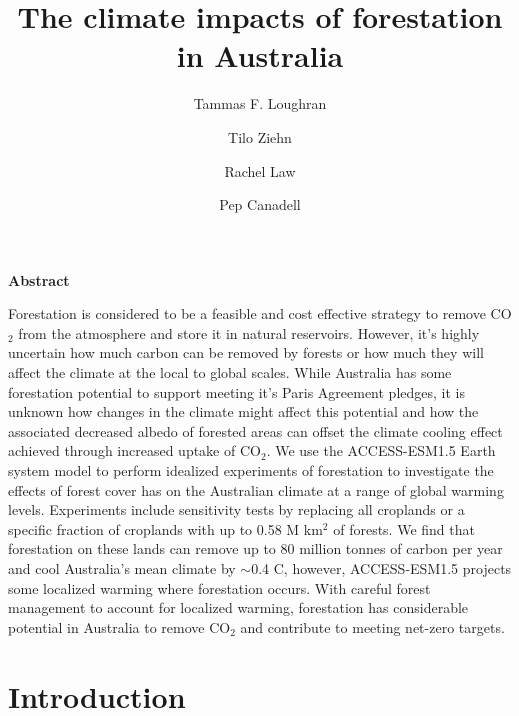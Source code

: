 \documentclass[]{article}
\title{The climate impacts of forestation in Australia}
\author[1]{Tammas F. Loughran}
\author[1]{Tilo Ziehn}
\author[1]{Rachel Law}
\author[1]{Pep Canadell}
\affil[1]{CSIRO, Environment, Australia}
\begin{document}
\maketitle

\begin{center}
    \Large
    \vspace{0.9cm}
    \textbf{Abstract}
\end{center}

Forestation is considered to be a feasible and cost effective strategy to remove CO$_2$ from the atmosphere and store it in natural reservoirs.
However, it's highly uncertain how much carbon can be removed by forests or how much they will affect the climate at the local to global scales.
While Australia has some forestation potential to support meeting it's Paris Agreement pledges, it is unknown how changes in the climate might affect this potential and how the associated decreased albedo of forested areas can offset the climate cooling effect achieved through increased uptake of CO$_2$.
We use the ACCESS-ESM1.5 Earth system model to perform idealized experiments of forestation to investigate the effects of forest cover has on the Australian climate at a range of global warming levels.
Experiments include sensitivity tests by replacing all croplands or a specific fraction of croplands with up to 0.58 M km$^2$ of forests.
We find that forestation on these lands can remove up to 80 million tonnes of carbon per year and cool Australia's mean climate by $\sim$0.4 \textdegree{}C, however, ACCESS-ESM1.5 projects some localized warming where forestation occurs.
With careful forest management to account for localized warming, forestation has considerable potential in Australia to remove CO$_2$ and contribute to meeting net-zero targets.

\raggedright
\parindent=0.35in %

\section{Introduction}
\end{document}
